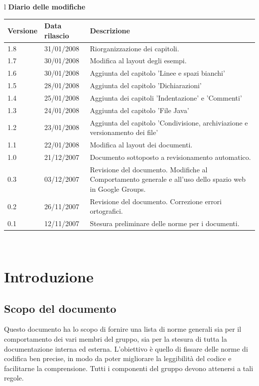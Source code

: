 \documentclass[11pt,titlepage,a4paper]{report}
\begin{document}
\begin{center}
\begin{table}[hbtp]
\large{
\begin{tabular}{l}
\Large{\textbf{\textsf{Diario delle modifiche}}} \\
\begin{tabular}{||p{2cm}||p{3.5cm}||p{6cm}||}
\hline
\textbf{Versione} & \textbf{Data rilascio} & \textbf{Descrizione} \\ \hline
1.8 & 31/01/2008 & Riorganizzazione dei capitoli. \\ \hline
1.7 & 30/01/2008 & Modifica al layout degli esempi.\\ \hline
1.6 & 30/01/2008 & Aggiunta del capitolo 'Linee e spazi bianchi'\\ \hline
1.5 & 28/01/2008 & Aggiunta del capitolo 'Dichiarazioni'\\ \hline
1.4 & 25/01/2008 & Aggiunta dei capitoli 'Indentazione' e 'Commenti'\\ \hline
1.3 & 24/01/2008 & Aggiunta del capitolo 'File Java'\\ \hline
1.2 & 23/01/2008 & Aggiunta del capitolo 'Condivisione, archiviazione e versionamento dei file'\\ \hline
1.1 & 22/01/2008 & Modifica al layout dei documenti.\\ \hline
1.0 & 21/12/2007 & Documento sottoposto a revisionamento automatico.\\ \hline
0.3 & 03/12/2007 & Revisione del documento. Modifiche al Comportamento generale e all'uso dello spazio web in Google Groups. \\ \hline
0.2 & 26/11/2007 & Revisione del documento. Correzione errori ortografici. \\ \hline
0.1 & 12/11/2007 & Stesura preliminare delle norme per i documenti. \\ \hline
\end{tabular} \\
\end{tabular}

}
\end{table}
\end{center}


\newpage
\tableofcontents 

\chapter{Introduzione}
\section{Scopo del documento}
Questo documento ha lo scopo di fornire una lista di norme generali sia per il comportamento dei vari membri del gruppo, sia per la stesura di tutta la documentazione interna ed esterna. L'obiettivo \`e quello di fissare delle norme di codifica ben precise, in modo da poter migliorare la leggibilit\`a del codice e facilitarne la comprensione. Tutti i componenti del gruppo devono attenersi a tali regole.
\end{document}
